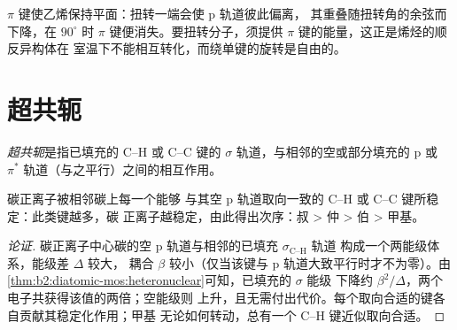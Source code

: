 $\pi$ 键使乙烯保持平面：扭转一端会使 p 轨道彼此偏离，
其重叠随扭转角的余弦而下降，在 $90^\circ$ 时
$\pi$ 键便消失。要扭转分子，须提供
$\pi$ 键的能量，这正是烯烃的顺反异构体在
室温下不能相互转化，而绕单键的旋转是自由的。

\section{超共轭}

\begin{definition}[超共轭]\label{def:b2:fragment-orbitals:hyperconjugation}
\emph{超共轭}是指已填充的
C--H 或 C--C 键的 $\sigma$ 轨道，与相邻的空或部分填充的 p
或 $\pi^*$ 轨道（与之平行）之间的相互作用。
\end{definition}

\begin{proposition}[烷基使碳正离子稳定]\label{prop:b2:fragment-orbitals:hyperconjugation}
碳正离子被相邻碳上每一个能够
与其空 p 轨道取向一致的 C--H 或 C--C 键所稳定：此类键越多，碳
正离子越稳定，由此得出次序：叔 > 仲 > 伯 > 甲基。
\end{proposition}

\begin{proof}[论证]
碳正离子中心碳的空 p 轨道与相邻的已填充 $\sigma_{\text{C--H}}$ 轨道
构成一个两能级体系，能级差 $\Delta$ 较大，
耦合 $\beta$ 较小（仅当该键与 p 轨道大致平行时才不为零）。由
\cref{thm:b2:diatomic-mos:heteronuclear}可知，已填充的 $\sigma$ 能级
下降约 $\beta^2/\Delta$，两个电子共获得该值的两倍；空能级则
上升，且无需付出代价。每个取向合适的键各自贡献其稳定化作用；甲基
无论如何转动，总有一个 C--H 键近似取向合适。
\end{proof}

